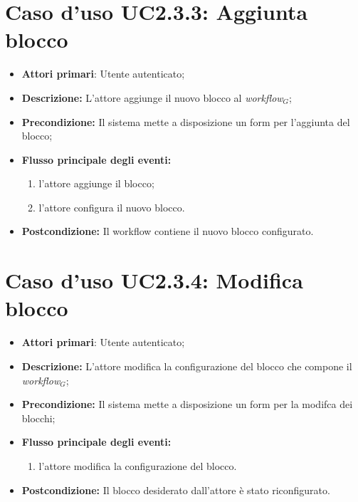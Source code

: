 		\section{Caso d'uso UC2.3.3: Aggiunta blocco }
		\begin{itemize}
			\item \textbf{Attori primari}: Utente autenticato;
			\item \textbf{Descrizione:} L'attore aggiunge il nuovo blocco al \textit{workflow$_{G}$};
			\item \textbf{Precondizione:} Il sistema mette a disposizione un form per l'aggiunta del blocco;
			\item \textbf{Flusso principale degli eventi:}
			\begin{enumerate}
				\item l'attore aggiunge il blocco;
				\item l'attore configura il nuovo blocco.
			\end{enumerate}
			\item \textbf{Postcondizione:} Il workflow contiene il nuovo blocco configurato.
		\end{itemize}
		\section{Caso d'uso UC2.3.4: Modifica blocco }
		\begin{itemize}
			\item \textbf{Attori primari}: Utente autenticato;
			\item \textbf{Descrizione:} L'attore modifica la configurazione del blocco che compone il \textit{workflow$_{G}$};
			\item \textbf{Precondizione:} Il sistema mette a disposizione un form per la modifca dei blocchi;
			\item \textbf{Flusso principale degli eventi:}
			\begin{enumerate}
				\item l'attore modifica la configurazione del blocco.
			\end{enumerate}
			\item \textbf{Postcondizione:} Il blocco desiderato dall'attore è stato riconfigurato.
		\end{itemize}
